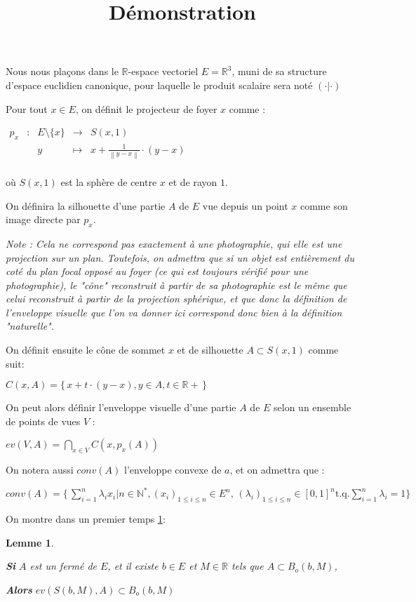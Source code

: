 \documentclass[a4paper]{article}
\title{Démonstration}
\newcommand{\norm}[1]{\left\lVert#1\right\rVert}
\newtheorem{lem}{Lemme}
\begin{document}
Nous nous plaçons dans le $\mathbb{R}$-espace vectoriel $E = \mathbb{R}^{3}$, muni de sa structure d'espace euclidien canonique, pour laquelle le produit scalaire sera noté $(\cdot|\cdot)$


Pour tout $x\in E$, on définit le projecteur de foyer $x$ comme :

$\begin{array}{ccccc}
p_{x} & : & E\setminus\{x\} & \to & S(x, 1) \\
 & & y & \mapsto & x  + \frac{1}{\norm{y - x}} \cdot (y - x) \\
\end{array}$

où $S(x, 1)$ est  la sphère de centre $x$ et de rayon $1$.


On définira la silhouette d'une  partie $A$ de $E$ vue depuis un point $x$ comme son image directe par $p_{x}$.

\textit{Note : Cela ne correspond pas exactement à une photographie, qui elle est une projection sur un plan. Toutefois, on admettra que si un objet est entièrement du coté du plan focal opposé au foyer (ce qui est toujours vérifié pour une photographie), le "cône" reconstruit à partir de sa photographie est le même que celui reconstruit à partir de la projection sphérique, et que donc la définition de l'enveloppe visuelle que l'on va donner ici correspond donc bien à la définition "naturelle".}

On définit ensuite le cône de sommet $x$ et de silhouette $A \subset S(x, 1)$ comme suit:

$C(x,A) = \{\,x + t\cdot{}(y - x), y\in{}A, t\in\mathbb{R}+\,\}$

On peut alors définir l'enveloppe visuelle d'une partie $A$ de $E$ selon un ensemble de points de vues $V$ :

$ev(V, A) = \bigcap_{x\in{}V}C(x,p_{x}(A))$

On notera aussi $conv(A)$ l'enveloppe convexe de $a$, et on admettra que :

$conv(A) = \{\,\sum_{i=1}^{n} \lambda_{i} x_{i}| n\in{}\mathbb{N}^{*}, (x_{i})_{1\leqslant i \leqslant n} \in E^{n}, \, (\lambda_{i})_{1\leqslant i \leqslant n} \in [0, 1]^{n}\text{t.q.} \sum_{i=1}^{n} \lambda_{i} = 1\}$

On montre dans un premier temps \ref{lem1}:

\begin{lem}\label{lem1}

\textbf{Si} $A$ est un fermé de $E$, et il existe $b \in E$ et $M \in \mathbb{R}$ tels que $A \subset B_{o}(b, M)$,

\textbf{Alors} $ev(S(b,M), A) \subset B_{o}(b, M)$

\end{lem}
\end{document}

